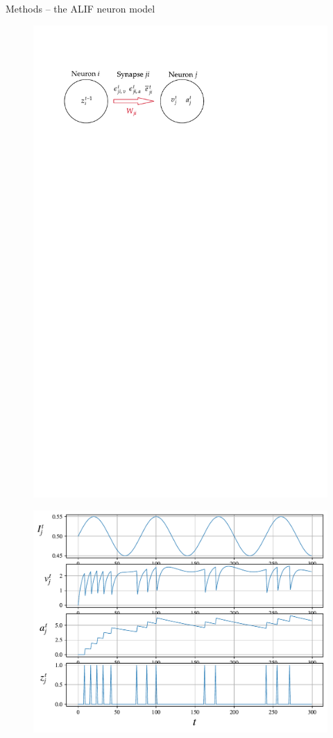 \documentclass[t]{beamer}
\begin{document}
\begin{frame}{Methods -- the ALIF neuron model}
  \begin{figure}[!ht]
    \centering
    \includegraphics[width=\linewidth]{Neuron}
  \end{figure}
  \begin{figure}[!ht]
    \centering
    \includegraphics[width=\linewidth]{simplealif}
  \end{figure}
\end{frame}
\end{document}
